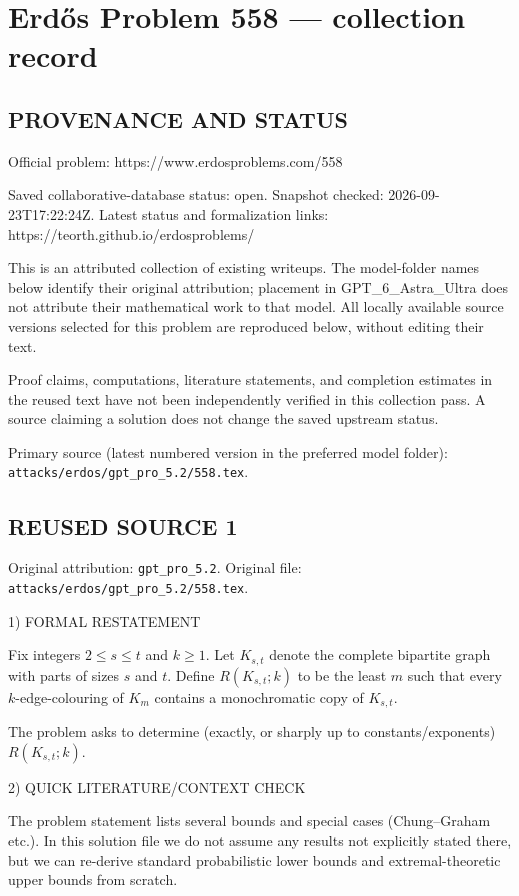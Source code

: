 \section*{Erd\H{o}s Problem 558 --- collection record}

\subsection*{PROVENANCE AND STATUS}
Official problem: https://www.erdosproblems.com/558

Saved collaborative-database status: open.
Snapshot checked: 2026-09-23T17:22:24Z.
Latest status and formalization links: https://teorth.github.io/erdosproblems/

This is an attributed collection of existing writeups. The model-folder names below identify their original attribution; placement in GPT\_6\_Astra\_Ultra does not attribute their mathematical work to that model. All locally available source versions selected for this problem are reproduced below, without editing their text.

Proof claims, computations, literature statements, and completion estimates in the reused text have not been independently verified in this collection pass. A source claiming a solution does not change the saved upstream status.

Primary source (latest numbered version in the preferred model folder): \texttt{attacks/erdos/gpt\_pro\_5.2/558.tex}.

\subsection*{REUSED SOURCE 1}
Original attribution: \texttt{gpt\_pro\_5.2}.
Original file: \texttt{attacks/erdos/gpt\_pro\_5.2/558.tex}.


1) FORMAL RESTATEMENT

Fix integers $2\le s\le t$ and $k\ge 1$.
Let $K_{s,t}$ denote the complete bipartite graph with parts of sizes $s$ and $t$.
Define $R(K_{s,t};k)$ to be the least $m$ such that every $k$-edge-colouring of $K_m$ contains a monochromatic copy of $K_{s,t}$.

The problem asks to determine (exactly, or sharply up to constants/exponents) $R(K_{s,t};k)$.

2) QUICK LITERATURE/CONTEXT CHECK

The problem statement lists several bounds and special cases (Chung--Graham etc.). In this solution file we do not assume any results not explicitly stated there, but we can re-derive standard probabilistic lower bounds and extremal-theoretic upper bounds from scratch.

